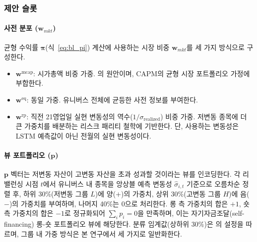 \documentclass{article}
\begin{document}
\subsubsection{제안 슬롯}\label{subsubsec:bl_proposed_slot}

\paragraph{사전 분포 ($\mathbf{w}_{mkt}$)}

균형 수익률 $\boldsymbol{\pi}$(식~\ref{eq:bl_pi}) 계산에 사용하는 시장 비중 $\mathbf{w}_{mkt}$를 세 가지 방식으로 구성한다.

\begin{itemize}
    \item $\mathbf{w}^{\mathrm{mcap}}$: 시가총액 비중 가중. \citet{pyo2018}의 원안이며, CAPM의 균형 시장 포트폴리오 가정에 부합한다.
    \item $\mathbf{w}^{\mathrm{eq}}$: 동일 가중. 유니버스 전체에 균등한 사전 정보를 부여한다.
    \item $\mathbf{w}^{\mathrm{rp}}$: 직전 21영업일 실현 변동성의 역수($1/\sigma_{\mathrm{realized}}$) 비중 가중. 저변동 종목에 더 큰 가중치를 배분하는 리스크 패리티\citep{maillard2010} 철학에 기반한다. 단, 사용하는 변동성은 LSTM 예측값이 아닌 전월의 실현 변동성이다.
\end{itemize}

\paragraph{뷰 포트폴리오 ($\mathbf{p}$)}

$\mathbf{p}$ 벡터는 저변동 자산이 고변동 자산을 초과 성과할 것이라는 뷰를 인코딩한다. 각 리밸런싱 시점 $t$에서 유니버스 내 종목을 앙상블 예측 변동성 $\hat{\sigma}_{i,t}$ 기준으로 오름차순 정렬 후, 하위 30\%(저변동 그룹 $L$)에 양($+$)의 가중치, 상위 30\%(고변동 그룹 $H$)에 음($-$)의 가중치를 부여하며, 나머지 40\%는 0으로 처리한다. 롱 측 가중치의 합은 $+1$, 숏 측 가중치의 합은 $-1$로 정규화되어 $\sum_i p_i = 0$을 만족하며, 이는 자기자금조달(self-financing) 롱-숏 포트폴리오 뷰에 해당한다. 분류 임계값(상하위 30\%)은 \citet{pyo2018}의 설정을 따르며, 그룹 내 가중 방식은 본 연구에서 세 가지로 일반화한다.
\end{document}
